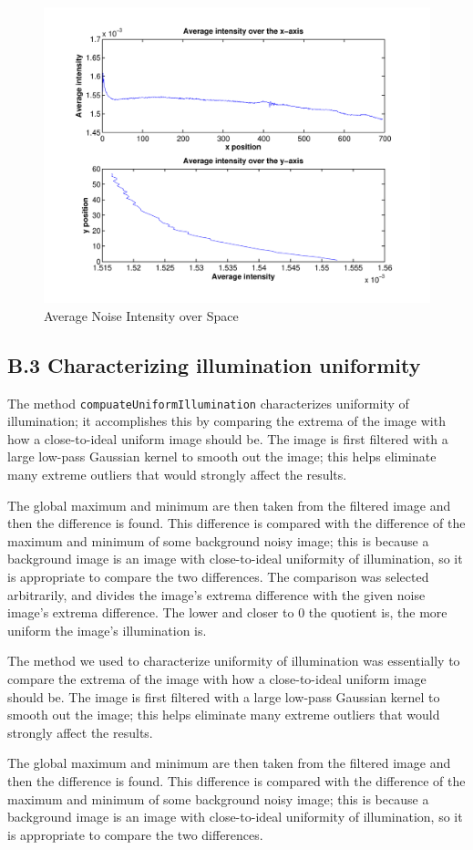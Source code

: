 \documentclass{article}
\begin{document}
\begin{figure}[t]
\centering
\includegraphics[width=0.45\linewidth]{figures/noise_over_space.pdf}
\caption{Average Noise Intensity over Space}
\label{fig:noise_intensity_space}
\end{figure}


\subsection*{B.3 Characterizing illumination uniformity}

The method \texttt{compuateUniformIllumination} characterizes uniformity of illumination; it accomplishes this by comparing the extrema of the image with how a close-to-ideal uniform image should be. The image is first filtered with a large low-pass Gaussian kernel to smooth out the image; this helps eliminate many extreme outliers that would strongly affect the results.

The global maximum and minimum are then taken from the filtered image and then the difference is found. This difference is compared with the difference of the maximum and minimum of some background noisy image; this is because a background image is an image with close-to-ideal uniformity of illumination, so it is appropriate to compare the two differences. The comparison was selected arbitrarily, and divides the image's extrema difference with the given noise image's extrema difference. The lower and closer to 0 the quotient is, the more uniform the image's illumination is.

The method we used to characterize uniformity of illumination was essentially to compare the extrema of the image with how a close-to-ideal uniform image should be. The image is first filtered with a large low-pass Gaussian kernel to smooth out the image; this helps eliminate many extreme outliers that would strongly affect the results.

The global maximum and minimum are then taken from the filtered image and then the difference is found.  This difference is compared with the difference of the maximum and minimum of some background noisy image; this is because a background image is an image with close-to-ideal uniformity of illumination, so it is appropriate to compare the two differences.
\end{document}
